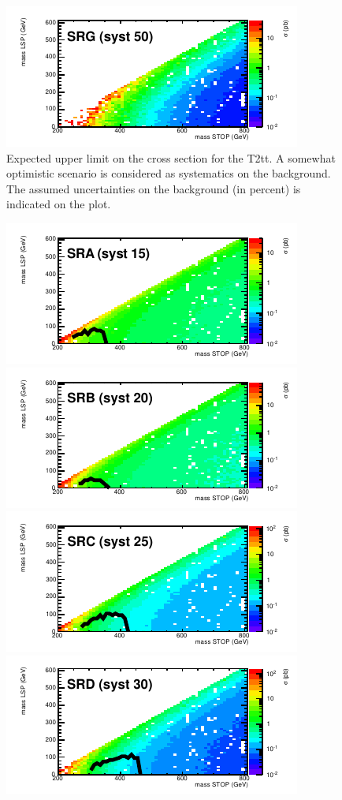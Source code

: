 \begin{figure}[hbt]
\begin{center}
        \includegraphics[width=0.5\linewidth]{plots/stopPlot/masses_SRG_xsecO.pdf}%
    \caption{Expected upper limit on the cross section for the
      T2tt. A somewhat optimistic scenario is considered as systematics on the
      background. The assumed uncertainties on the background (in percent) is indicated on the plot.}
\label{fig:limO}
      \end{center}
\end{figure}

\begin{figure}[hbt]
  \begin{center}
        \includegraphics[width=0.5\linewidth]{plots/stopPlot/masses_SRA_xsecP.pdf}%
        \includegraphics[width=0.5\linewidth]{plots/stopPlot/masses_SRB_xsecP.pdf}
        \includegraphics[width=0.5\linewidth]{plots/stopPlot/masses_SRC_xsecP.pdf}%
        \includegraphics[width=0.5\linewidth]{plots/stopPlot/masses_SRD_xsecP.pdf}

\end{center}
\end{figure}
